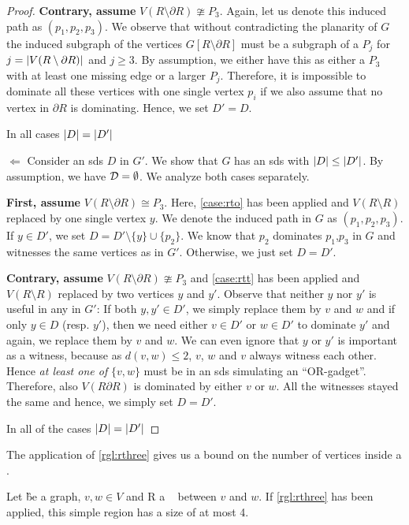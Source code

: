\begin{proof}
         \textbf{Contrary, assume} $V(R \setminus \partial R) \ncong P_3$. Again, let us denote this induced path as $(p_1,p_2,p_3)$. We observe that without contradicting the planarity of $G$ the induced subgraph of the vertices $G[R \setminus \partial R]$ must be a subgraph of a $P_j$ for $j = \abs{V(R \setminus \partial R)}$ and  $j \geq 3$.  By assumption, we either have this as either a $P_3$ with at least one missing edge or a larger $P_j$. Therefore, it is impossible to dominate all these vertices with one single vertex $p_i$ if we also assume that no vertex in $\partial R$ is dominating. Hence, we set $D' = D$.

         In all cases $\abs{D} = \abs{D'}$
        \item[$\Leftarrow$] Consider an sds $D$ in $G'$. We show that $G$ has an sds with $\abs{D} \leq \abs{D'}$. By assumption, we have $\mathcal{D} = \emptyset$. We analyze both cases separately.

         \textbf{First, assume} $V(R \setminus \partial R) \cong P_3$. Here, \cref{case:rto} has been applied and $V(R \setminus R)$ replaced by one single vertex $y$. We denote the induced path in $G$ as $(p_1,p_2,p_3)$.
         If $y \in D'$, we set $D = D' \setminus \{y\} \cup \{p_2\}$. We know that $p_2$ dominates $p_1$,$p_3$ in $G$ and witnesses the same vertices as in $G'$. 
         Otherwise, we just set $D = D'$. 

         \textbf{Contrary, assume} $V(R \setminus \partial R) \ncong P_3$ and \cref{case:rtt} has been applied and $V(R \setminus R)$ replaced by two vertices $y$ and $y'$. Observe that neither $y$ nor $y'$ is useful in any \sdom in $G'$: If both $y, y' \in D'$, we simply replace them by $v$ and $w$ and if only $y \in D$ (resp. $y'$), then we need either $v \in D'$ or $w \in D'$ to dominate $y'$ and again, we replace them by $v$ and $w$. 
         We can even ignore that $y$ or $y'$ is important as a witness, because as $d(v,w) \leq 2$, $v$, $w$ and $v$ always witness each other.
         Hence \textit{at least one of} $\{v,w \}$ must be in an sds simulating an ``OR-gadget''. Therefore, also $V(R \partial R)$ is dominated by either $v$ or $w$. All the witnesses stayed the same and hence, we simply set $D = D'$.
         
         In all of the cases $\abs{D} = \abs{D'}$
\end{proof}

The application of \cref{rgl:rthree} gives us a bound on the number of vertices inside a \sr. 
\begin{corollary}\label{lemma:simpleregionbound}
    Let \G be a graph, $v, w\in V$ and R a \sr~ between $v$ and $w$. If \cref{rgl:rthree} has been applied, this simple region has a size of at most 4.
\end{corollary}

